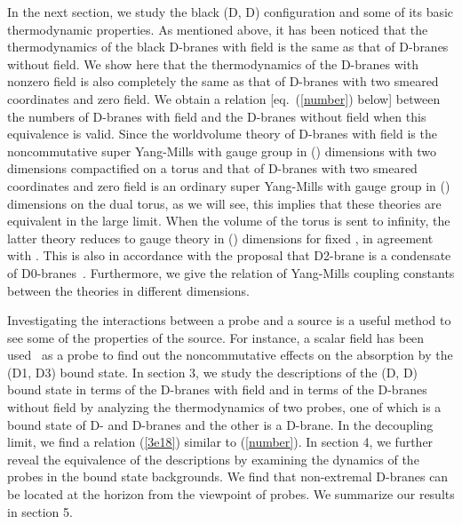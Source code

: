 \documentclass[a4paper,12pt]{article}
\begin{document}
In the next section, we study the black (D\coordHE{}, D\coordHE{}) configuration and
some of its basic thermodynamic properties. As mentioned above, it has been
noticed that the thermodynamics of the black D\coordHE{}-branes with \coordHE{} field is
the same as that of D\coordHE{}-branes without \coordHE{} field. We show here that the
thermodynamics of the D\coordHE{}-branes with nonzero \coordHE{} field is also completely
the same as that of D\coordHE{}-branes with two smeared coordinates and zero
\coordHE{} field. We obtain a relation [eq.~(\ref{number}) below] between
the numbers of D\coordHE{}-branes with \coordHE{} field and the D\coordHE{}-branes without
\coordHE{} field when this equivalence is valid. Since the worldvolume theory of
D\coordHE{}-branes with \coordHE{} field is the noncommutative super Yang-Mills with gauge
group \coordHE{} in (\coordHE{}) dimensions with two dimensions compactified on
a torus and that of D\coordHE{}-branes with two smeared coordinates and zero \coordHE{}
field is an ordinary super Yang-Mills with gauge group \coordHE{} in (\coordHE{})
dimensions on the dual torus, as we will see, this implies that these
theories are equivalent in the large \coordHE{} limit. When the volume of the torus
is sent to infinity, the latter theory reduces to \coordHE{} gauge theory
in (\coordHE{}) dimensions for fixed \coordHE{}, in agreement with \cite{Lu}.
This is also in accordance with the proposal that D2-brane is a condensate
of D0-branes~\cite{T,Ishibashi1,Ishibashi2}. Furthermore, we give the
relation of Yang-Mills coupling constants between the theories in different
dimensions.

Investigating the interactions between a probe and a source is a useful
method to see some of the properties of the source. For instance, a scalar
field has been used~\cite{Kaya,Myung1,Myung2} as a probe to find out the
noncommutative effects on the absorption by the (D1, D3) bound state.
In section 3, we study the descriptions of the (D\coordHE{}, D\coordHE{}) bound
state in terms of the D\coordHE{}-branes with \coordHE{} field and in terms of the
D\coordHE{}-branes without \coordHE{} field by analyzing the thermodynamics of two
probes, one of which is a bound state of D\coordHE{}- and D\coordHE{}-branes and the
other is a D\coordHE{}-brane. In the decoupling limit, we find a relation
(\ref{3e18}) similar to (\ref{number}). In section 4, we further
reveal the equivalence of the descriptions by examining the dynamics of
the probes in the bound state backgrounds. We find that non-extremal
D-branes can be located at the horizon from the viewpoint of probes.
We summarize our results in section 5.
\end{document}
